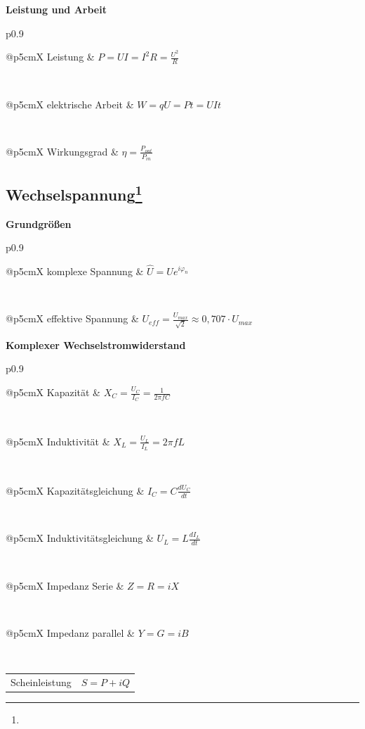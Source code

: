 \documentclass[12pt,a4paper, twoside]{article}
\makeatletter
\renewcommand{\d}[2]{\frac{d #1}{d #2}}
\renewcommand{\=}[1]{\stackrel{#1}{=}}
\theoremstyle{definition}
\theoremstyle{remark}
\newcommand{\concept}[2]{%
\noindent
\begin{framed}
\noindent\textbf{#1}
\par\begin{tabular}{p{0.9\linewidth}}
#2
\end{tabular}
\end{framed}
}
\newcommand{\f}[2]{%
\noindent\begin{tabularx}{\linewidth}{@{}p{5cm}X}
#1 & $#2$
\end{tabularx}}
\makeatother
\begin{document}
\concept{Leistung und Arbeit}{
\f{Leistung}{P = U I = I^2 R = \frac{U^2}{R}}\\
\f{elektrische Arbeit}{W = q U = P t = U I t}\\
\f{Wirkungsgrad}{\eta = \frac{P_{out}}{P_{in}}}

}



\subsection[Wechselspannung]{Wechselspannung\let\thefootnote\relax\footnote{}}

\concept{Grundgrößen}{
\f{komplexe Spannung}{\hat U = U e^{i \varphi_n}}\\
\f{effektive Spannung}{U_{eff} = \frac{U_{max}}{\sqrt{2}} \approx 0,707 \cdot U_{max}}

}

\concept{Komplexer Wechselstromwiderstand}{
\f{Kapazität}{X_C = \frac{U_C}{I_C} = \frac{1}{2\pi f C}}\\
\f{Induktivität}{X_L = \frac{U_L}{I_L} = 2\pi f L}\\
\f{Kapazitätsgleichung}{I_C = C \d{U_C}{t}}\\
\f{Induktivitätsgleichung}{U_L = L \d{I_L}{t}}\\
\f{Impedanz Serie}{Z = R = i X}\\
\f{Impedanz parallel}{Y = G = i B}\\
\f{Scheinleistung}{S = P + i Q}
}
\end{document}
